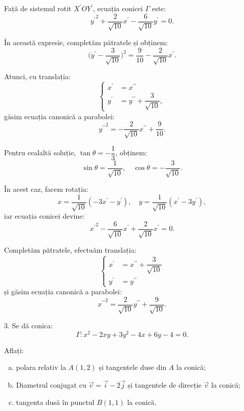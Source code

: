 \documentclass[11pt,a4paper]{article}
\theoremstyle{dotless}
\theoremstyle{dotlessdr}
\begin{document}
Față de sistemul rotit $X^{\prime}OY^{\prime}$, ecuația conicei $\Gamma$ este: 
 \[
	{y^{\prime}}^2 + \dfrac{2}{\sqrt{10}}x^{\prime} - 
	\dfrac{6}{\sqrt{10}} y^{\prime} = 0.
\]

În această expresie, completăm pătratele și obținem: 
 \[
    \Big( y^{\prime} - \dfrac{3}{\sqrt{10}} \Big)^2 = 
    \dfrac{9}{10} - \dfrac{2}{\sqrt{10}} x^{\prime}.
\]

Atunci, cu translația: 
 \[
	\begin{cases}	
	    x^{\prime} &= x^{\prime\prime} \\
	    y^{\prime} &= y^{\prime\prime} + \dfrac{3}{\sqrt{10}},
    \end{cases}
\]
găsim ecuația canonică a parabolei: 
 \[
{y^{\prime\prime}}^2 = -\dfrac{2}{\sqrt{10}}x^{\prime\prime} + \dfrac{9}{10}.
\]

Pentru cealaltă soluție, $\tan \theta = -\dfrac{1}{3}$, obținem: 
 \[
\sin\theta = \dfrac{1}{\sqrt{10}}, \quad \cos \theta = - \dfrac{3}{\sqrt{10}}.
\]

În acest caz, facem rotația: 
 \[
	x = \dfrac{1}{\sqrt{10}}(-3x^{\prime} - y^{\prime}), \quad
	y = \dfrac{1}{\sqrt{10}}(x^{\prime} - 3y^{\prime}),
\]
iar ecuația conicei devine: 
 \[
	{x^{\prime}}^2 - \dfrac{6}{\sqrt{10}}x^{\prime} + 
	\dfrac{2}{\sqrt{10}} x^{\prime} = 0.
\]

Completăm pătratele, efectuăm translația: 
 \[
	\begin{cases}	
	    x^{\prime} &= x^{\prime\prime} + \dfrac{3}{\sqrt{10}} \\
	    y^{\prime} &= y^{\prime\prime}
    \end{cases}
\]
și găsim ecuația canonică a parabolei: 
 \[
	{x^{\prime\prime}}^2 = \dfrac{2}{\sqrt{10}}y^{\prime\prime} + 
	\dfrac{9}{\sqrt{10}}.
\]



3. Se dă conica: 
 \[
	\Gamma: x^2 - 2xy + 3y^2 - 4x + 6y - 4 = 0.
\]

Aflați:
\begin{enumerate}[(a)]
	\item polara relativ la $A(1,2)$ și tangentele duse din $A$ la conică;
	\item Diametrul conjugat cu $\vec{v} = \vec{i} - 2 \vec{j}$ și tangentele
de direcție $\vec{v}$ la conică;
	\item tangenta dusă în punctul $B(1,1)$ la conică.
\end{enumerate}
\end{document}
